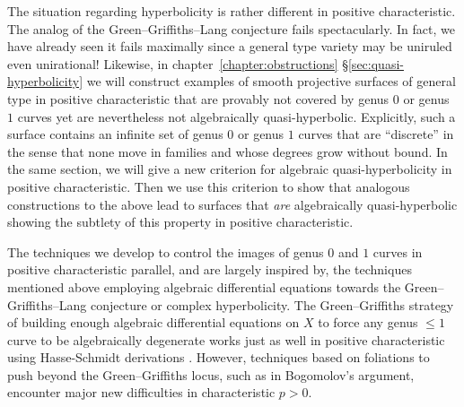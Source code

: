 \documentclass[main.tex]{subfiles}
\begin{document}
The situation regarding hyperbolicity is rather different in positive characteristic. The analog of the Green--Griffiths--Lang conjecture fails spectacularly. In fact, we have already seen it fails maximally since a general type variety may be uniruled even unirational! Likewise, in chapter~\ref{chapter:obstructions} \S\ref{sec:quasi-hyperbolicity} we will construct examples of smooth projective surfaces of general type in positive characteristic that are provably not covered by genus $0$ or genus $1$ curves yet are nevertheless not algebraically quasi-hyperbolic. Explicitly, such a surface contains an infinite set of genus $0$ or genus $1$ curves that are ``discrete'' in the sense that none move in families and whose degrees grow without bound. In the same section, we will give a new criterion for algebraic quasi-hyperbolicity in positive characteristic. Then we use this criterion to show that analogous constructions to the above lead to surfaces that \textit{are} algebraically quasi-hyperbolic showing the subtlety of this property in positive characteristic. 
\par 
The techniques we develop to control the images of genus $0$ and $1$ curves in positive characteristic parallel, and are largely inspired by, the techniques mentioned above employing algebraic differential equations towards the Green--Griffiths--Lang conjecture or complex hyperbolicity. The Green--Griffiths strategy of building enough algebraic differential equations on $X$ to force any genus $\le 1$ curve to be algebraically degenerate works just as well in positive characteristic using Hasse-Schmidt derivations \cite{cadorel_generalized_jets}. However, techniques based on foliations to push beyond the Green--Griffiths locus, such as in Bogomolov's argument, encounter major new difficulties in characteristic $p>0$.
\par 
\end{document}
